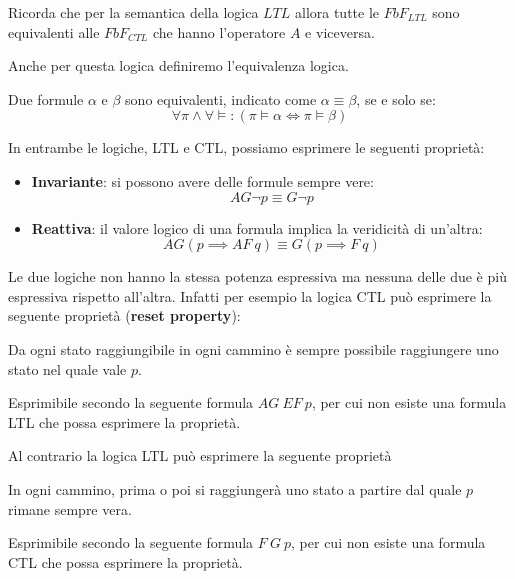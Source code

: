\begin{nota}
    Ricorda che per la semantica della logica $LTL$ allora tutte le $FbF_{LTL}$
    sono equivalenti alle $FbF_{CTL}$ che hanno l'operatore $A$ e viceversa.
\end{nota}
Anche per questa logica definiremo l'equivalenza logica.
\begin{definizione}
    Due formule $\alpha$ e $\beta$ sono equivalenti, indicato come $\alpha \equiv
        \beta$, se e solo se:
    \begin{equation}
        \forall \pi \land \forall \models : (\pi \models \alpha \iff \pi \models
        \beta)
    \end{equation}
\end{definizione}
In entrambe le logiche, LTL e CTL, possiamo esprimere le seguenti proprietà:
\begin{itemize}
    \item \textbf{Invariante}: si possono avere delle formule sempre vere:
          \begin{equation}
              AG\lnot p \equiv G\lnot p
          \end{equation}
    \item \textbf{Reattiva}: il valore logico di una formula implica la veridicità
          di un'altra:
          \begin{equation}
              AG (p\implies AF \ q) \equiv G(p\implies F \ q)
          \end{equation}
\end{itemize}
Le due logiche non hanno la stessa potenza espressiva ma nessuna delle due è più
espressiva rispetto all'altra. Infatti per esempio la logica CTL può esprimere
la seguente proprietà (\textbf{reset property}):
\begin{center}
    Da ogni stato raggiungibile in ogni cammino è sempre possibile raggiungere
    uno stato nel quale vale $p$.
\end{center}
Esprimibile secondo la seguente formula $AG \ EF \ p$, per cui non esiste una formula
LTL che possa esprimere la proprietà.

Al contrario la logica LTL può esprimere la seguente proprietà
\begin{center}
    In ogni cammino, prima o poi si raggiungerà uno stato a partire dal quale $p$
    rimane sempre vera.
\end{center}
Esprimibile secondo la seguente formula $F \ G \ p$, per cui non esiste una formula
CTL che possa esprimere la proprietà.

